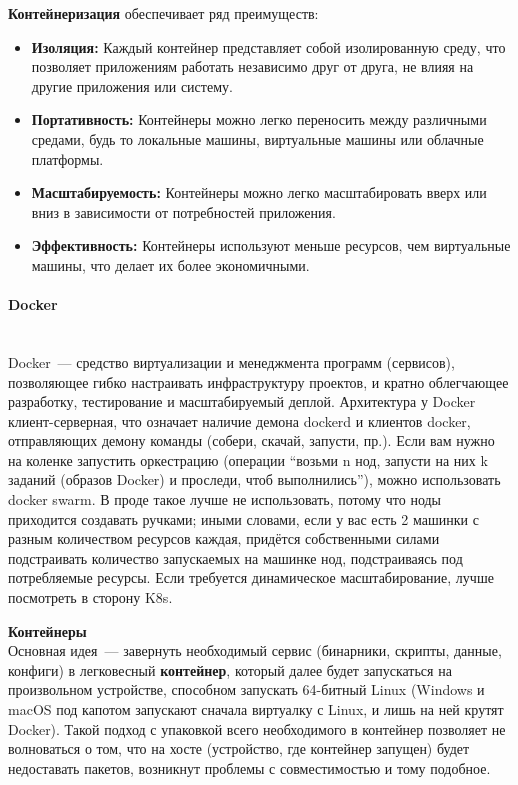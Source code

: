 \textbf{Контейнеризация} обеспечивает ряд преимуществ:

\begin{itemize}
\item \textbf{Изоляция:} Каждый контейнер представляет собой изолированную среду, 
что позволяет приложениям работать независимо друг от друга, 
не влияя на другие приложения или систему.
\item \textbf{Портативность:} Контейнеры можно легко переносить между различными 
средами, будь то локальные машины, виртуальные машины или облачные платформы.
\item \textbf{Масштабируемость:} Контейнеры можно легко масштабировать 
вверх или вниз в зависимости от потребностей приложения.
\item \textbf{Эффективность:} Контейнеры используют меньше ресурсов, чем виртуальные машины, 
что делает их более экономичными.
\end{itemize}

\paragraph{Docker} ~\\

    Docker~--- средство виртуализации и менеджмента программ (сервисов), позволяющее гибко настраивать инфраструктуру проектов, и кратно облегчающее разработку, тестирование и масштабируемый деплой.
    Архитектура у Docker клиент-серверная, что означает наличие демона dockerd и клиентов docker, отправляющих демону команды (собери, скачай, запусти, пр.). Если вам нужно на коленке запустить оркестрацию
    (операции ``возьми n нод, запусти на них k заданий (образов Docker) и проследи, чтоб выполнились''), можно использовать docker swarm. \autocite{DockerSwarmConcepts} В проде такое лучше не использовать,
    потому что ноды приходится создавать ручками; иными словами, если у вас есть 2 машинки с разным количеством ресурсов каждая, придётся собственными силами подстраивать количество запускаемых на машинке нод,
    подстраиваясь под потребляемые ресурсы. Если требуется динамическое масштабирование, лучше посмотреть в сторону K8s.

    \textbf{Контейнеры} ~\\
    Основная идея~--- завернуть необходимый сервис (бинарники, скрипты, данные, конфиги) в легковесный \textbf{контейнер}, который далее будет запускаться на произвольном устройстве, способном запускать
    64-битный Linux (Windows и macOS под капотом запускают сначала виртуалку с Linux, и лишь на ней крутят Docker). Такой подход с упаковкой всего необходимого в контейнер позволяет не волноваться о том,
    что на хосте (устройство, где контейнер запущен) будет недоставать пакетов, возникнут проблемы с совместимостью и тому подобное.

